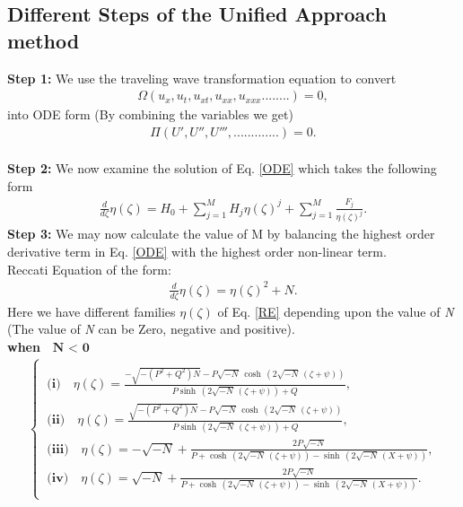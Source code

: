 \documentclass[10pt]{NSP1}
\numberwithin{equation}{section}
\begin{document}
\subsection{Different Steps of the Unified Approach method}
\textbf{Step 1:}
We use the traveling wave transformation equation to convert
\begin{eqnarray}\label{PDE}
\Omega(u_x,u_t,u_{xt},u_{xx},u_{xxx}........)=0,
\end{eqnarray}
into ODE form (By combining the variables we get)
\begin{eqnarray}\label{ODE}
\Pi(U',U'',U''',.............)=0.
\end{eqnarray}\\
\textbf{Step 2:}
 We now examine the solution of Eq. \ref{ODE} which takes the following form
\begin{eqnarray}\label{TF}
\frac{d}{d \zeta}\eta \! \left(\zeta \right) =H_{0}+ \sum_{j=1}^M H_{j}\eta \left(\zeta \right)^{j}+\sum_{j=1}^M \frac{F_{j}}{\eta \left(\zeta \right)^{j}}.
\end{eqnarray}
\textbf{Step 3:}
We may now calculate the value of M by balancing the highest order derivative term in Eq. \ref{ODE} with the highest order non-linear term.\\
Reccati Equation of the form:
\begin{eqnarray}\label{RE}
\frac{d}{d \zeta}\eta \! \left(\zeta \right) =\eta \! \left(\zeta \right)^{2}+N.
\end{eqnarray}
Here we have different families ${\eta(\zeta)}$ of Eq. \ref{RE} depending upon the value of \emph{N} (The value of \emph{N} can be Zero, negative and positive). \\
\textbf{when $\textbf{ N $<$ 0} $ }
\begin{align}\label{FAM1}
\begin{cases}\\\
\textbf{(i)}\quad \eta \! \left(\zeta \right) =\frac{-\sqrt{-\left(P^{2}+Q^{2}\right) N}-P \sqrt{-N}\, \cosh \, \left(2 \sqrt{-N}\, \left(\zeta +\psi \right)\right)}{P \sinh \, \left(2 \sqrt{-N}\, \left(\zeta +\psi \right)\right)+Q},\\\
\textbf{(ii)}\quad \eta \! \left(\zeta \right) =\frac{\sqrt{-\left(P^{2}+Q^{2}\right) N}-P \sqrt{-N}\, \cosh \, \left(2 \sqrt{-N}\, \left(\zeta +\psi \right)\right)}{P \sinh \, \left(2 \sqrt{-N}\, \left(\zeta +\psi \right)\right)+Q},\\\
\textbf{(iii)}\quad \eta \! \left(\zeta \right) =-\sqrt{-N}+\frac{2 P \sqrt{-N}}{P +\cosh \, \left(2 \sqrt{-N}\, \left(\zeta +\psi \right)\right)-\sinh \, \left(2 \sqrt{-N}\, \left(X +\psi \right)\right)},\\\
\textbf{(iv)}\quad \eta \! \left(\zeta \right) =\sqrt{-N}+\frac{2 P \sqrt{-N}}{P +\cosh \, \left(2 \sqrt{-N}\, \left(\zeta +\psi \right)\right)-\sinh \, \left(2 \sqrt{-N}\, \left(X +\psi \right)\right)}.\\
\end{cases}
\end{align}
\end{document}
